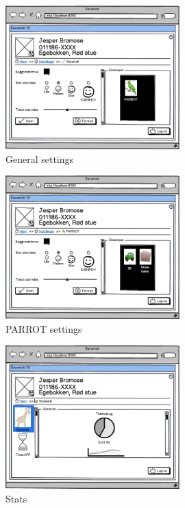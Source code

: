 \begin{figure}[H]
	\centering
		\includegraphics[width=0.60\textwidth]{images/Mocks/231-GeneralSettings.png}
	\caption{General settings}
	\label{fig:231-GeneralSettings}
\end{figure}

\begin{figure}
	\centering
		\includegraphics[width=0.60\textwidth]{images/Mocks/232-ParrotSettings.png}
	\caption{PARROT settings}
	\label{fig:232-ParrotSettings}
\end{figure}


\begin{figure}[H]
	\centering
		\includegraphics[width=0.60\textwidth]{images/Mocks/24-Stats.png}
	\caption{Stats}
	\label{fig:24-Stats}
\end{figure}

